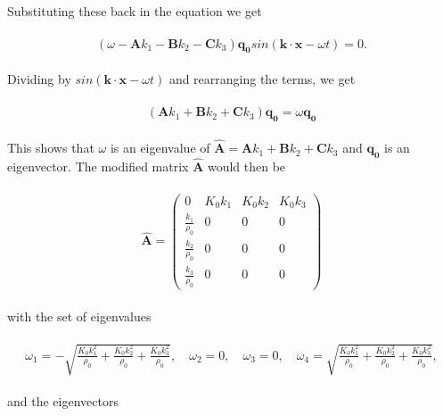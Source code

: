 Substituting these back in the equation we get

\begin{align}
    \begin{split}
        \left(\omega - \mathbf{A}k_1 - \mathbf{B}k_2 - \mathbf{C}k_3\right)\mathbf{q_0}sin\left(\mathbf{k}\cdot\mathbf{x} - \omega t\right) = 0.
    \end{split}
\end{align}

Dividing by $sin\left(\mathbf{k}\cdot\mathbf{x} - \omega t\right)$ and rearranging the terms, we get

\begin{align}
    \begin{split}
        \left(\mathbf{A}k_1 + \mathbf{B}k_2 + \mathbf{C}k_3\right)\mathbf{q_0} = \omega \mathbf{q_0}
    \end{split}
\end{align}

This shows that $\omega$ is an eigenvalue of $\mathbf{\hat{A}} = \mathbf{A}k_1 + \mathbf{B}k_2 + \mathbf{C}k_3$ and $\mathbf{q_0}$ is an eigenvector. The modified matrix $\mathbf{\hat{A}}$ would then be

\begin{align}
    \begin{split}
    \mathbf{\hat{A}} = \left(\begin{array}{rrrr}
0 & K_{0} k_{1} & K_{0} k_{2} & K_{0} k_{3} \\
\frac{k_{1}}{\rho_{0}} & 0 & 0 & 0 \\
\frac{k_{2}}{\rho_{0}} & 0 & 0 & 0 \\
\frac{k_{3}}{\rho_{0}} & 0 & 0 & 0
\end{array}\right)
    \end{split}
\end{align}

with the set of eigenvalues

\begin{align}
    \begin{split}
        \omega_1 = -\sqrt{\frac{K_{0} k_{1}^{2}}{\rho_{0}} + \frac{K_{0} k_{2}^{2}}{\rho_{0}} + \frac{K_{0} k_{3}^{2}}{\rho_{0}}}, \quad
        \omega_2 = 0, \quad
        \omega_3 = 0, \quad 
        \omega_4 = \sqrt{\frac{K_{0} k_{1}^{2}}{\rho_{0}} + \frac{K_{0} k_{2}^{2}}{\rho_{0}} + \frac{K_{0} k_{3}^{2}}{\rho_{0}}}, 
    \end{split}
\end{align}

and the eigenvectors

